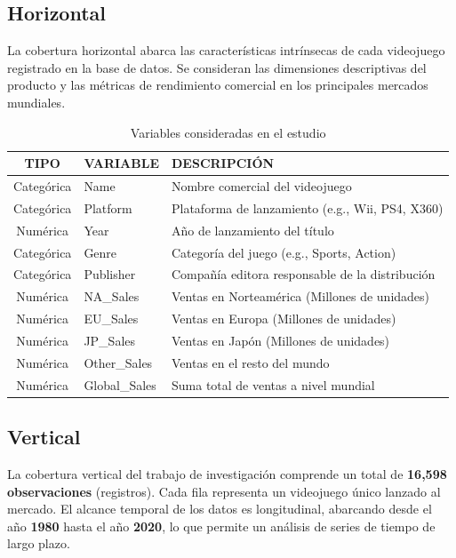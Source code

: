 \documentclass[oneside,11pt]{Latex/Classes/PhDthesisPSnPDF}
\begin{document}
\subsection{Horizontal}

La cobertura horizontal abarca las características intrínsecas de cada
videojuego registrado en la base de datos. Se consideran las dimensiones
descriptivas del producto y las métricas de rendimiento comercial en los
principales mercados mundiales.

\begin{table}[ht]
\centering
\caption{Variables consideradas en el estudio} 
\resizebox{12cm}{!} {
\begin{tabular}{cll}
  \hline
  \textbf{TIPO} & \textbf{VARIABLE} & \textbf{DESCRIPCIÓN} \\ 
  \hline
  Categórica & Name & Nombre comercial del videojuego \\ 
  Categórica & Platform & Plataforma de lanzamiento (e.g., Wii, PS4, X360) \\ 
  Numérica & Year & Año de lanzamiento del título \\ 
  Categórica & Genre & Categoría del juego (e.g., Sports, Action) \\ 
  Categórica & Publisher & Compañía editora responsable de la distribución \\ 
  Numérica & NA\_Sales & Ventas en Norteamérica (Millones de unidades) \\ 
  Numérica & EU\_Sales & Ventas en Europa (Millones de unidades) \\ 
  Numérica & JP\_Sales & Ventas en Japón (Millones de unidades) \\ 
  Numérica & Other\_Sales & Ventas en el resto del mundo \\ 
  Numérica & Global\_Sales & Suma total de ventas a nivel mundial \\ 
   \hline
\end{tabular}
}
\end{table}

\subsection{Vertical}

La cobertura vertical del trabajo de investigación comprende un total de
\textbf{16,598 observaciones} (registros). Cada fila representa un
videojuego único lanzado al mercado. El alcance temporal de los datos es
longitudinal, abarcando desde el año \textbf{1980} hasta el año
\textbf{2020}, lo que permite un análisis de series de tiempo de largo
plazo.
\end{document}
